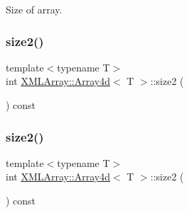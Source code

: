 Size of array. 

\mbox{\label{classXMLArray_1_1Array4d_a18c3f8237c652b642c5de6df15764c34}} 
\subsubsection{\texorpdfstring{size2()}{size2()}\hspace{0.1cm}{\footnotesize\ttfamily [1/2]}}
{\footnotesize\ttfamily template$<$typename T$>$ \\
int \mbox{\hyperlink{classXMLArray_1_1Array4d}{X\+M\+L\+Array\+::\+Array4d}}$<$ T $>$\+::size2 (\begin{DoxyParamCaption}{ }\end{DoxyParamCaption}) const\hspace{0.3cm}{\ttfamily [inline]}}

\mbox{\label{classXMLArray_1_1Array4d_a18c3f8237c652b642c5de6df15764c34}} 
\subsubsection{\texorpdfstring{size2()}{size2()}\hspace{0.1cm}{\footnotesize\ttfamily [2/2]}}
{\footnotesize\ttfamily template$<$typename T$>$ \\
int \mbox{\hyperlink{classXMLArray_1_1Array4d}{X\+M\+L\+Array\+::\+Array4d}}$<$ T $>$\+::size2 (\begin{DoxyParamCaption}{ }\end{DoxyParamCaption}) const\hspace{0.3cm}{\ttfamily [inline]}}


